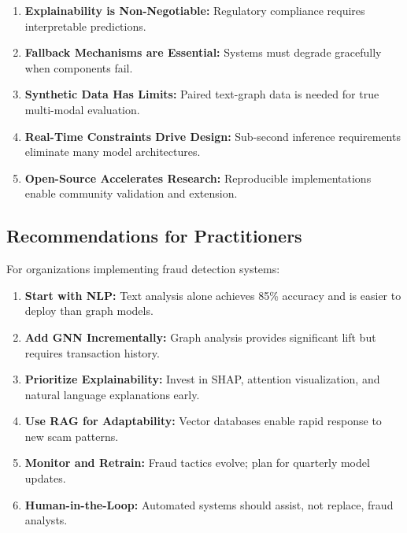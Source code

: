 \begin{enumerate}
    \item \textbf{Explainability is Non-Negotiable:} Regulatory compliance requires interpretable predictions.
    \item \textbf{Fallback Mechanisms are Essential:} Systems must degrade gracefully when components fail.
    \item \textbf{Synthetic Data Has Limits:} Paired text-graph data is needed for true multi-modal evaluation.
    \item \textbf{Real-Time Constraints Drive Design:} Sub-second inference requirements eliminate many model architectures.
    \item \textbf{Open-Source Accelerates Research:} Reproducible implementations enable community validation and extension.
\end{enumerate}

\subsection{Recommendations for Practitioners}

For organizations implementing fraud detection systems:

\begin{enumerate}
    \item \textbf{Start with NLP:} Text analysis alone achieves 85\% accuracy and is easier to deploy than graph models.
    \item \textbf{Add GNN Incrementally:} Graph analysis provides significant lift but requires transaction history.
    \item \textbf{Prioritize Explainability:} Invest in SHAP, attention visualization, and natural language explanations early.
    \item \textbf{Use RAG for Adaptability:} Vector databases enable rapid response to new scam patterns.
    \item \textbf{Monitor and Retrain:} Fraud tactics evolve; plan for quarterly model updates.
    \item \textbf{Human-in-the-Loop:} Automated systems should assist, not replace, fraud analysts.
\end{enumerate}
